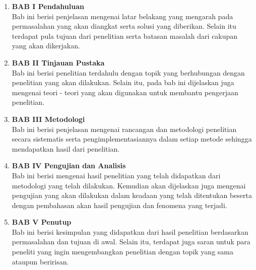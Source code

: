 \begin{enumerate}[nolistsep]

  \item \textbf{BAB I Pendahuluan} \\     
      Bab ini berisi penjelasan mengenai latar belakang yang mengarah pada permasalahan yang akan diangkat serta solusi yang diberikan. Selain itu terdapat pula tujuan dari penelitian serta batasan masalah dari cakupan yang akan dikerjakan.
        \vspace{2ex}

  \item \textbf{BAB II Tinjauan Pustaka} \\
      Bab ini berisi penelitian terdahulu dengan topik yang berhubungan dengan penelitian yang akan dilakukan. Selain itu, pada bab ini dijelaskan juga mengenai teori - teori yang akan digunakan untuk membantu pengerjaan penelitian.

        \vspace{2ex}

  \item \textbf{BAB III Metodologi} \\
      Bab ini berisi penjelasan mengenai rancangan dan metodologi penelitian secara sistematis serta pengimplementasiannya dalam setiap metode sehingga mendapatkan hasil dari penelitian.

        \vspace{2ex}

  \item \textbf{BAB IV Pengujian dan Analisis} \\
      Bab ini berisi mengenai hasil penelitian yang telah didapatkan dari metodologi yang telah dilakukan. Kemudian akan dijelaskan juga mengenai pengujian yang akan dilakukan dalam keadaan yang telah ditentukan beserta dengan pembahasan akan hasil pengujian dan fenomena yang terjadi. 

        \vspace{2ex}

  \item \textbf{BAB V Penutup} \\
      Bab ini berisi kesimpulan yang didapatkan dari hasil penelitian berdasarkan permasalahan dan tujuan di awal. Selain itu, terdapat juga saran untuk para peneliti yang ingin mengembangkan penelitian dengan topik yang sama ataupun beririsan.

\end{enumerate}